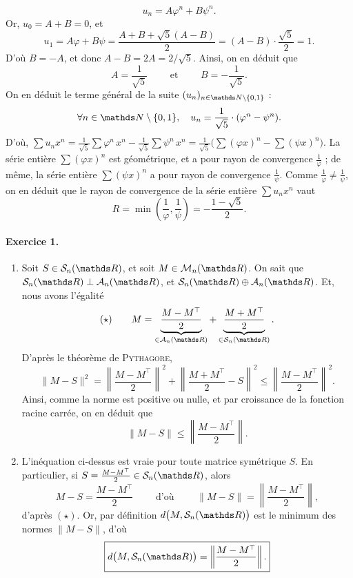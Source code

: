 \documentclass[a4paper]{article}
\begin{document}
\begin{enumerate}
\[				u_n = A \varphi^n + B \psi^n
			.\]  Or, $u_0 = A + B = 0$, et \[
				u_1 = A\varphi + B \psi = \frac{A + B + \sqrt{5} (A - B)}{2} = (A-B) \cdot \frac{\sqrt{5}}{2} = 1
			.\] D'où $B = -A$, et donc $A - B = 2A = 2 / \sqrt{5}$. Ainsi, on en déduit que  \[
				A = \frac{1}{\sqrt{5}} \quad\quad \text{ et } \quad\quad B = -\frac{1}{\sqrt{5}}
			.\] On en déduit le terme général de la suite $(u_n)_{n\in\N}$\/ : \[
				\forall n \in \N,\quad u_n = \frac{1}{\sqrt{5}} \cdot (\varphi^n - \psi^n)
			.\]
			D'où, $\sum u_n x^n = \frac{1}{\sqrt{5}} \sum \varphi^n\,x^n - \frac{1}{\sqrt{5}} \sum \psi^n\,x^n = \frac{1}{\sqrt{5}}\big(\sum (\varphi x)^n - \sum (\psi x)^n\big)$. La série entière $\sum (\varphi x)^n$\/ est géométrique, et a pour rayon de convergence $\frac{1}{\varphi}$\/ ; de même, la série entière $\sum (\psi x)^n$\/ a pour rayon de convergence $\frac{1}{\psi}$.
			Comme $\frac{1}{\varphi} \neq \frac{1}{\psi}$, on en déduit que le rayon de convergence de la série entière $\sum u_n x^n$\/ vaut  \[
				\boxed{R = \min\left(\frac{1}{\varphi}, \frac{1}{\psi}\right) = -\frac{1 - \sqrt{5}}{2}.}
			\]
	\end{enumerate}

	\paragraph{Exercice 1.}
	\begin{enumerate}
		\item Soit $S \in \mathcal{S}_n(\R)$, et soit $M \in \mathcal{M}_n(\R)$.
			On sait que $\mathcal{S}_n(\R) \perp \mathcal{A}_n(\R)$, et $\mathcal{S}_n(\R) \oplus \mathcal{A}_n(\R)$.
			Et, nous avons l'égalité \[
			(\star)\quad\quad M = \underbrace{\frac{M - M^\top}{2}}_{\in \mathcal{A}_n(\R)} + \underbrace{\frac{M+M^\top}{2}}_{\in \mathcal{S}_n(\R)}
			.\] D'après le théorème de \textsc{Pythagore}, \[
				\|M - S\|^2 = \left\| \frac{M-M^\top}{2}\right\|^2 + \left\|\frac{M+M^\top}{2} - S\right\|^2 \le \left\| \frac{M-M^\top}{2}\right\|^2
			.\] Ainsi, comme la norme est positive ou nulle, et par croissance de la fonction racine carrée, on en déduit que \[
				\boxed{\|M - S\| \le \left\| \frac{M-M^\top}{2}\right\|.}
			\]
		\item L'inéquation ci-dessus est vraie pour toute matrice symétrique $S$. En particulier, si $S = \frac{M - M^\top}{2} \in \mathcal{S}_n(\R)$, alors \[
			M - S = \frac{M - M^\top}{2} \quad\quad \text{ d'où } \quad\quad \|M - S\| = \left\|\frac{M - M^\top}{2}\right\|,
		\] d'après $(\star)$. Or, par définition $d\big(M, \mathcal{S}_n(\R)\big)$ est le minimum des normes $\|M - S\|$, d'où \[
			\boxed{d\big(M, \mathcal{S}_n(\R)\big) = \left\|\frac{M - M^\top}{2}\right\|.}
		\] 
	\end{enumerate}
\end{document}
